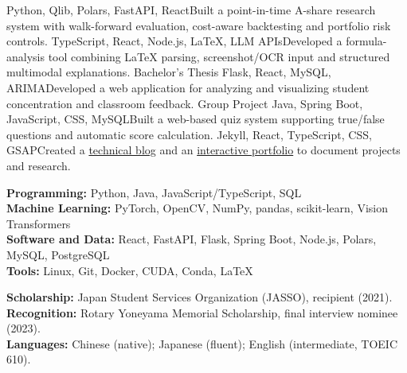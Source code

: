 \documentclass{resume}
\begin{document}
 {Python, Qlib, Polars, FastAPI, React}{Built a point-in-time A-share research system with walk-forward evaluation, cost-aware backtesting and portfolio risk controls.}
 {TypeScript, React, Node.js, LaTeX, LLM APIs}{Developed a formula-analysis tool combining LaTeX parsing, screenshot/OCR input and structured multimodal explanations.}
 {Bachelor's Thesis \quad\textperiodcentered\quad Flask, React, MySQL, ARIMA}{Developed a web application for analyzing and visualizing student concentration and classroom feedback.}
 {Group Project \quad\textperiodcentered\quad Java, Spring Boot, JavaScript, CSS, MySQL}{Built a web-based quiz system supporting true/false questions and automatic score calculation.}
 {Jekyll, React, TypeScript, CSS, GSAP}{Created a \href{https://shengruduzhou.github.io/}{technical blog} and an \href{https://shanhefu-portfolio.vercel.app/}{interactive portfolio} to document projects and research.}

\textbf{Programming:} Python, Java, JavaScript/TypeScript, SQL\\
\textbf{Machine Learning:} PyTorch, OpenCV, NumPy, pandas, scikit-learn, Vision Transformers\\
\textbf{Software and Data:} React, FastAPI, Flask, Spring Boot, Node.js, Polars, MySQL, PostgreSQL\\
\textbf{Tools:} Linux, Git, Docker, CUDA, Conda, \LaTeX

\textbf{Scholarship:} Japan Student Services Organization (JASSO), recipient (2021).\\
\textbf{Recognition:} Rotary Yoneyama Memorial Scholarship, final interview nominee (2023).\\
\textbf{Languages:} Chinese (native); Japanese (fluent); English (intermediate, TOEIC 610).
\end{document}
